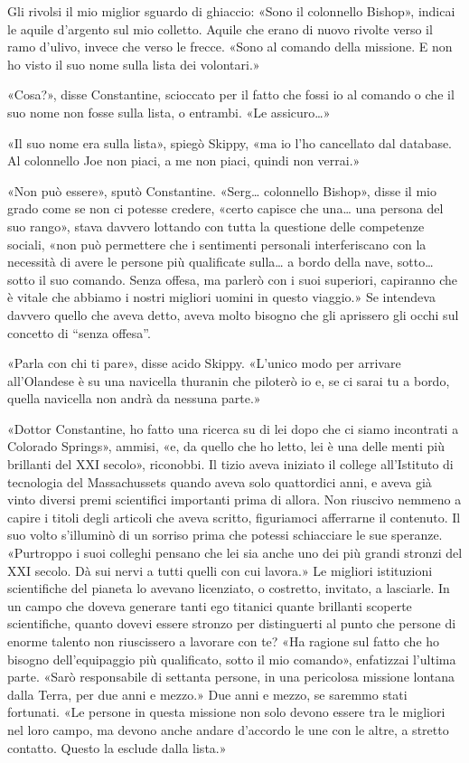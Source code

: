 Gli rivolsi il mio miglior sguardo di ghiaccio: «Sono il colonnello
Bishop», indicai le aquile d'argento sul mio colletto. Aquile che erano
di nuovo rivolte verso il ramo d'ulivo, invece che verso le frecce.
«Sono al comando della missione. E non ho visto il suo nome sulla lista
dei volontari.»

«Cosa?», disse Constantine, scioccato per il fatto che fossi io al
comando o che il suo nome non fosse sulla lista, o entrambi. «Le
assicuro\ldots»

«Il suo nome era sulla lista», spiegò Skippy, «ma io l'ho cancellato dal
database. Al colonnello Joe non piaci, a me non piaci, quindi non
verrai.»

«Non può essere», sputò Constantine. «Serg\ldots{} colonnello Bishop»,
disse il mio grado come se non ci potesse credere, «certo capisce che
una\ldots{} una persona del suo rango», stava davvero lottando con tutta
la questione delle competenze sociali, «non può permettere che i
sentimenti personali interferiscano con la necessità di avere le persone
più qualificate sulla\ldots{} a bordo della nave, sotto\ldots{} sotto il
suo comando. Senza offesa, ma parlerò con i suoi superiori, capiranno
che è vitale che abbiamo i nostri migliori uomini in questo viaggio.» Se
intendeva davvero quello che aveva detto, aveva molto bisogno che gli
aprissero gli occhi sul concetto di ``senza offesa''.

«Parla con chi ti pare», disse acido Skippy. «L'unico modo per arrivare
all'Olandese è su una navicella thuranin che piloterò io e, se ci sarai
tu a bordo, quella navicella non andrà da nessuna parte.»

«Dottor Constantine, ho fatto una ricerca su di lei dopo che ci siamo
incontrati a Colorado Springs», ammisi, «e, da quello che ho letto, lei
è una delle menti più brillanti del XXI secolo», riconobbi. Il tizio
aveva iniziato il college all'Istituto di tecnologia del Massachussets
quando aveva solo quattordici anni, e aveva già vinto diversi premi
scientifici importanti prima di allora. Non riuscivo nemmeno a capire i
titoli degli articoli che aveva scritto, figuriamoci afferrarne il
contenuto. Il suo volto s'illuminò di un sorriso prima che potessi
schiacciare le sue speranze. «Purtroppo i suoi colleghi pensano che lei
sia anche uno dei più grandi stronzi del XXI secolo. Dà sui nervi a
tutti quelli con cui lavora.» Le migliori istituzioni scientifiche del
pianeta lo avevano licenziato, o costretto, invitato, a lasciarle. In un
campo che doveva generare tanti ego titanici quante brillanti scoperte
scientifiche, quanto dovevi essere stronzo per distinguerti al punto che
persone di enorme talento non riuscissero a lavorare con te? «Ha ragione
sul fatto che ho bisogno dell'equipaggio più qualificato, sotto il mio
comando», enfatizzai l'ultima parte. «Sarò responsabile di settanta
persone, in una pericolosa missione lontana dalla Terra, per due anni e
mezzo.» Due anni e mezzo, se saremmo stati fortunati. «Le persone in
questa missione non solo devono essere tra le migliori nel loro campo,
ma devono anche andare d'accordo le une con le altre, a stretto
contatto. Questo la esclude dalla lista.»

